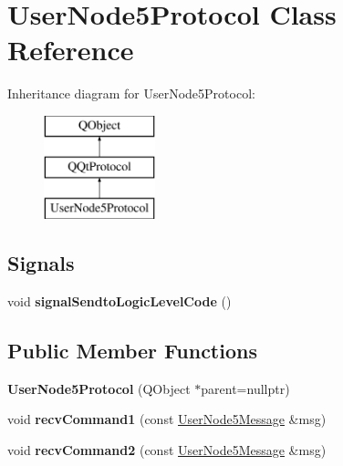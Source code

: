 \hypertarget{class_user_node5_protocol}{}\section{User\+Node5\+Protocol Class Reference}
\label{class_user_node5_protocol}
Inheritance diagram for User\+Node5\+Protocol\+:\begin{figure}[H]
\begin{center}
\leavevmode
\includegraphics[height=3.000000cm]{class_user_node5_protocol}
\end{center}
\end{figure}
\subsection*{Signals}
\begin{DoxyCompactItemize}
\item 
\mbox{\label{class_user_node5_protocol_a5c9f44cea8e04929092202b06b45df4d}} 
void {\bfseries signal\+Sendto\+Logic\+Level\+Code} ()
\end{DoxyCompactItemize}
\subsection*{Public Member Functions}
\begin{DoxyCompactItemize}
\item 
\mbox{\label{class_user_node5_protocol_a82c44ed3235d35bd29bd882eed5c47a6}} 
{\bfseries User\+Node5\+Protocol} (Q\+Object $\ast$parent=nullptr)
\item 
\mbox{\label{class_user_node5_protocol_afad9c8f9e922a465f1295f47a72c56ae}} 
void {\bfseries recv\+Command1} (const \mbox{\hyperlink{class_user_node5_message}{User\+Node5\+Message}} \&msg)
\item 
\mbox{\label{class_user_node5_protocol_aea81a5649571a2090263a31a71bda83f}} 
void {\bfseries recv\+Command2} (const \mbox{\hyperlink{class_user_node5_message}{User\+Node5\+Message}} \&msg)
\end{DoxyCompactItemize}
